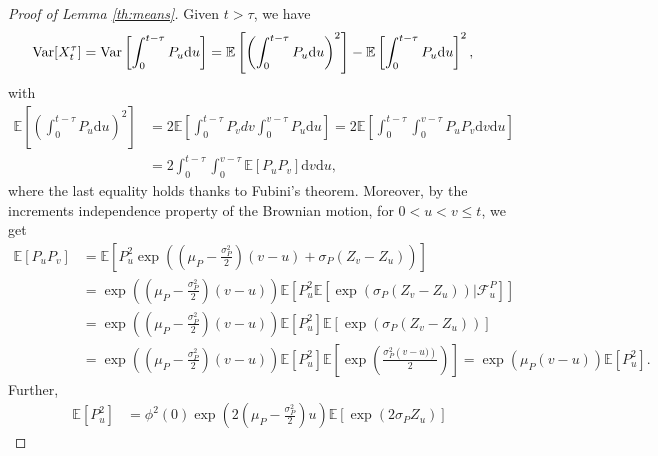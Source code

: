 \documentclass[12pt,centertags,reqno]{amsart}
\numberwithin{equation}{section} \makeatletter
\def \F {\mathcal F}
\newcommand{\ud}{\mathrm d}
\newcommand{\esp}[2][\mathbb E] {#1\left[#2\right]}
\newcommand{\condespfu}[2][\F_u]       {\mathbb E\left.\left[#2\right|#1\right]}
\begin{document}
\begin{proof}[Proof of Lemma \ref{th:means}]
Given $t > \tau$, we have
\begin{align}
{\rm Var}[X_t^\tau] & %
= {\rm Var}\left[\int_0^{t-\tau} P_u \ud u\right]
= \esp{\left(\int_0^{t-\tau} P_u \ud u\right)^2} - \esp{\int_0^{t-\tau} P_u \ud u}^2,
\end{align}
with
\begin{align}
\esp{\left(\int_0^{t-\tau} P_u \ud u\right)^{2}} & = %
2\esp{\int_{0}^{t-\tau}P_{v}dv\int_{0}^{v-\tau}P_{u}\ud u} %
= %
2\esp{\int_{0}^{t-\tau}\int_{0}^{v-\tau}P_{u}P_{v}\ud v\ud u} \nonumber\\
& = %
2\int_{0}^{t-\tau}\int_{0}^{v-\tau}\esp{P_{u}P_{v}}\ud v\ud u, \label{eq:MP2}
\end{align}
where the last equality holds thanks to Fubini’s theorem. Moreover, by the increments independence property of the Brownian motion, for $0 < u < v \leq t$, we get
\begin{align*}
\esp{P_{u}P_{v}} & = \esp{P_{u}^{2}\exp\left(\left(\mu_{P}-\frac{\sigma_{P}^{2}}{2}\right)(v-u)+\sigma_{P}\left(Z_{v}-Z_{u}\right)\right)}\\
& =\exp\left(\left(\mu_{P}-\frac{\sigma_{P}^{2}}{2}\right)(v-u)\right) \esp{P_{u}^{2}\esp{\exp\left(\sigma_{P}\left(Z_{v}-Z_{u}\right)\right)|\F_u^P}}\\
& =\exp\left(\left(\mu_{P}-\frac{\sigma_{P}^{2}}{2}\right)(v-u)\right) \esp{P_{u}^{2}}\esp{\exp\left(\sigma_{P}\left(Z_{v}-Z_{u}\right)\right)}\\
& =\exp\left(\left(\mu_{P}-\frac{\sigma_{P}^{2}}{2}\right)(v-u)\right) \esp{P_{u}^{2}}\esp{\exp\left(\frac{\sigma_{P}^{2}\left(v-u)\right)}{2}\right)}=\exp\left(\mu_{P}(v-u)\right)\esp{P_{u}^{2}}.
\end{align*}
Further,
\begin{align*}
\esp{P_{u}^{2}} & %
=\phi^2(0)\exp\left(2\left(\mu_{P}-\frac{\sigma_{P}^{2}}{2}\right)u\right)\esp{\exp\left(2\sigma_{P}Z_{u}\right)}

\end{align*}
\end{proof}
\end{document}
